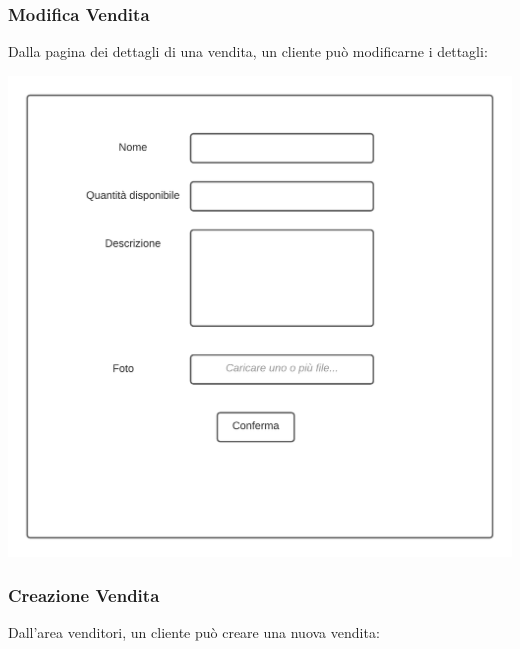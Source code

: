 \documentclass[12pt]{article}
\begin{document}
\newpage

\subsubsection{Modifica Vendita}
Dalla pagina dei dettagli di una vendita, un cliente può modificarne i dettagli:

\begin{center}
\includegraphics[height=0.3\textheight]{Mockup/Cliente/NuovaVendita}
\end{center}

\subsubsection{Creazione Vendita}
Dall'area venditori, un cliente può creare una nuova vendita:
\end{document}

